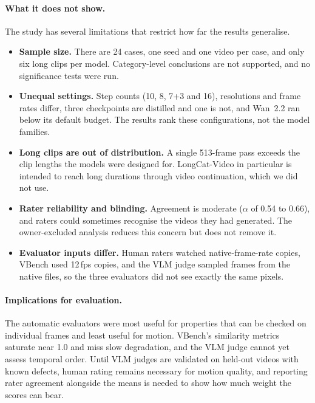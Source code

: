 \documentclass[11pt,a4paper]{article}
\begin{document}
\paragraph{What it does not show.}
The study has several limitations that restrict how far the results generalise.
\begin{itemize}
  \item \textbf{Sample size.} There are 24 cases, one seed and one video per case, and only six long clips per model. Category-level conclusions are not supported, and no significance tests were run.
  \item \textbf{Unequal settings.} Step counts (10, 8, 7+3 and 16), resolutions and frame rates differ, three checkpoints are distilled and one is not, and Wan~2.2 ran below its default budget. The results rank these configurations, not the model families.
  \item \textbf{Long clips are out of distribution.} A single 513-frame pass exceeds the clip lengths the models were designed for. LongCat-Video in particular is intended to reach long durations through video continuation, which we did not use.
  \item \textbf{Rater reliability and blinding.} Agreement is moderate ($\alpha$ of 0.54 to 0.66), and raters could sometimes recognise the videos they had generated. The owner-excluded analysis reduces this concern but does not remove it.
  \item \textbf{Evaluator inputs differ.} Human raters watched native-frame-rate copies, VBench used 12\,fps copies, and the VLM judge sampled frames from the native files, so the three evaluators did not see exactly the same pixels.
\end{itemize}

\paragraph{Implications for evaluation.}
The automatic evaluators were most useful for properties that can be checked on individual frames and least useful for motion. VBench's similarity metrics saturate near 1.0 and miss slow degradation, and the VLM judge cannot yet assess temporal order. Until VLM judges are validated on held-out videos with known defects, human rating remains necessary for motion quality, and reporting rater agreement alongside the means is needed to show how much weight the scores can bear.

\end{document}
